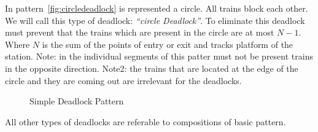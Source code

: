 \documentclass{ewic}
\begin{document}
			In pattern~\ref{fig:circledeadlock} is represented a circle. All trains block each other. We will call this type of deadlock:  \emph{``circle Deadlock''}. To eliminate this deadlock must prevent that the trains which are present in the circle are at most $N-1$. Where $N$ is the sum of the points of entry or exit and tracks platform of the station. Note: in the individual segments of this patter must not be present trains in the opposite direction. Note2: the trains that are located at the edge of the circle and they are coming out are irrelevant for the deadlocks.
			
			\begin{figure}[!htp]
			 \centering
			
			 
			
			\caption{Simple Deadlock Pattern}
			 \label{fig:simpledeadlockpattern}
			 \end{figure}
			
			
			
			All other types of deadlocks are referable to compositions of basic pattern.
			
			
\end{document}
